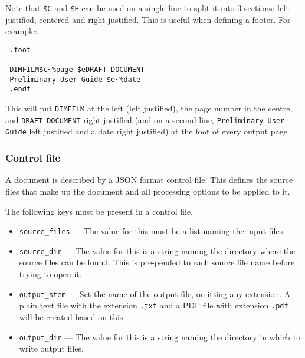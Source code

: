 \documentclass[a4paper,twoside,11pt]{article}
\newcommand{\newpara}{\par\vspace{4mm}\noindent}
\newcommand{\textttc}[1]{\texttt{\textcolor{OurRed}{#1}}}
\begin{document}
\newpara
Note that \texttt{\$C} and \texttt{\$E} can be used on a single line to split it into 3 sections: left justified,
centered and right justified. This is useful when defining a footer. For example:
\begin{lstlisting}
 .foot

 DIMFILM$c~%page $eDRAFT DOCUMENT
 Preliminary User Guide $e~%date
 .endf
\end{lstlisting}
This will put \texttt{DIMFILM} at the left (left justified), the page number in the centre,
and \texttt{DRAFT DOCUMENT}
right justified (and on a second line, \texttt{Preliminary User Guide} left justified and a date
right justified) at the foot of every output page.

\subsubsection{Control file}
A document is described by a JSON format control file. This defines the source files that
make up the document and all processing options to be applied to it.

\newpara
The following keys must be present in a control file.
\begin{itemize}
\item \textttc{source\_files} --- The value for this must be a list naming the input files.
\item \textttc{source\_dir} --- The value for this is a string naming the directory where the source files can be found.
  This is pre-pended to each source file name before trying to open it.
\item \textttc{output\_stem} --- Set the name of the output file, omitting any extension. A plain text file with the
  extension \texttt{.txt} and a PDF file with extension \texttt{.pdf} will be created based on this.
\item \textttc{output\_dir} --- The value for this is a string naming the directory in which to write output files.
\end{itemize}
\end{document}
